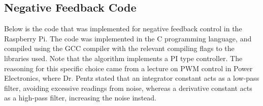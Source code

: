 \documentclass[a4paper, 12pt]{article}
\begin{document}
\newpage
\begin{appendices}
	\section{Negative Feedback Code}
	\label{sec:feedback_code}
	Below is the code that was implemented for negative feedback control in
	the Raspberry Pi. The code was implemented in the C programming
	language, and compiled using the GCC compiler with the relevant
	compiling flags to the libraries used. Note that the algorithm
	implements a PI type controller. The reasoning for this specific choice
	came from a lecture on PWM control in Power Electronics, where Dr.
	Pentz stated that an integrator constant acts as a low-pass filter,
	avoiding excessive readings from noise, whereas a derivative constant
	acts as a high-pass filter, increasing the noise instead.
	

\end{appendices}
\end{document}
